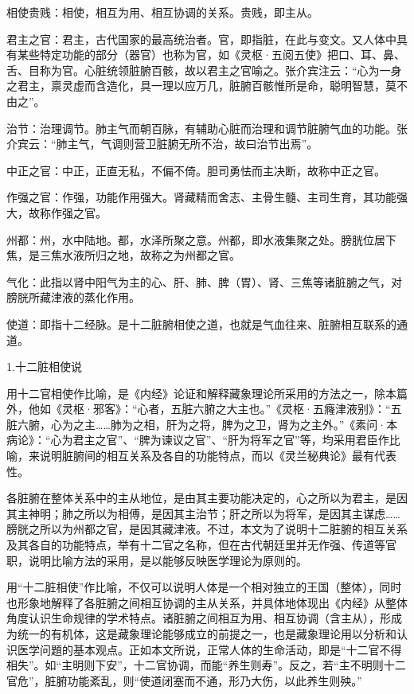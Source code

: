 \documentclass[12pt]{ctexbook}
\begin{document}
\begin{jiaozhu}
  \item 相使贵贱：相使，相互为用、相互协调的关系。贵贱，即主从。
  \item 君主之官：君主，古代国家的最高统治者。官，即指脏，在此与变文。又人体中具有某些特定功能的部分（器官）也称为官，如《灵枢·五阅五使》把口、耳、鼻、舌、目称为官。心脏统领脏腑百骸，故以君主之官喻之。张介宾注云：“心为一身之君主，禀灵虚而含造化，具一理以应万几，脏腑百骸惟所是命，聪明智慧，莫不由之”。
  \item 治节：治理调节。肺主气而朝百脉，有辅助心脏而治理和调节脏腑气血的功能。张介宾云：“肺主气，气调则营卫脏腑无所不治，故曰治节出焉”。
  \item 中正之官：中正，正直无私，不偏不倚。胆司勇怯而主决断，故称中正之官。
  \item 作强之官：作强，功能作用强大。肾藏精而舍志、主骨生髓、主司生育，其功能强大，故称作强之官。
  \item 州都：州，水中陆地。都，水泽所聚之意。州都，即水液集聚之处。膀胱位居下焦，是三焦水液所归之地，故称之为州都之官。
  \item 气化：此指以肾中阳气为主的心、肝、肺、脾（胃）、肾、三焦等诸脏腑之气，对膀胱所藏津液的蒸化作用。
  \item 使道：即指十二经脉。是十二脏腑相使之道，也就是气血往来、脏腑相互联系的通道。
\end{jiaozhu}


1.十二脏相使说

用十二官相使作比喻，是《内经》论证和解释藏象理论所采用的方法之一，除本篇外，他如《灵枢·邪客》：“心者，五脏六腑之大主也。”《灵枢·五癃津液别》：“五脏六腑，心为之主……肺为之相，肝为之将，脾为之卫，肾为之主外。”《素问·本病论》：“心为君主之官”、“脾为谏议之官”、“肝为将军之官”等，均采用君臣作比喻，来说明脏腑间的相互关系及各自的功能特点，而以《灵兰秘典论》最有代表性。

各脏腑在整体关系中的主从地位，是由其主要功能决定的，心之所以为君主，是因其主神明；肺之所以为相傅，是因其主治节；肝之所以为将军，是因其主谋虑……膀胱之所以为州都之官，是因其藏津液。不过，本文为了说明十二脏腑的相互关系及其各自的功能特点，举有十二官之名称，但在古代朝廷里并无作强、传道等官职，说明比喻方法的采用，是以能够反映医学理论为原则的。

用“十二脏相使”作比喻，不仅可以说明人体是一个相对独立的王国（整体），同时也形象地解释了各脏腑之间相互协调的主从关系，并具体地体现出《内经》从整体角度认识生命规律的学术特点。诸脏腑之间相互为用、相互协调（含主从），形成为统一的有机体，这是藏象理论能够成立的前提之一，也是藏象理论用以分析和认识医学问題的基本观点。正如本文所说，正常人体的生命活动，即是“十二官不得相失”。如“主明则下安”，十二官协调，而能“养生则寿”。反之，若“主不明则十二官危”，脏腑功能紊乱，则“使道闭塞而不通，形乃大伤，以此养生则殃。”
\end{document}
